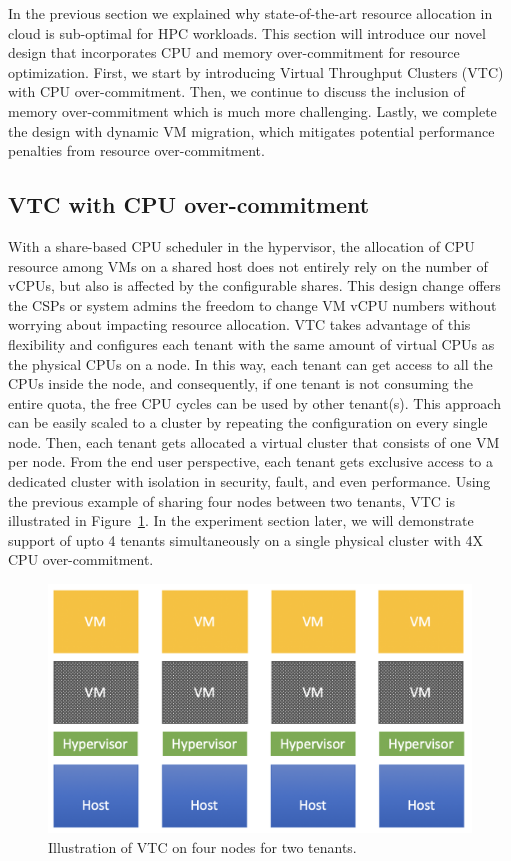 In the previous section we explained why state-of-the-art resource allocation in cloud 
is sub-optimal for HPC workloads. This section will introduce our novel design that incorporates 
CPU and memory over-commitment for resource optimization. First, we start by introducing 
Virtual Throughput Clusters (VTC) with CPU over-commitment. Then, we continue to discuss the 
inclusion of memory over-commitment which is much more challenging. Lastly, we complete the design 
with dynamic VM migration, which mitigates potential 
performance penalties from resource over-commitment. 

\subsection{VTC with CPU over-commitment}
With a share-based CPU scheduler in the hypervisor, the allocation of CPU resource among VMs on a 
shared host does not entirely rely on the number of vCPUs, but also is affected by the configurable shares. 
This design change offers the CSPs or system admins the freedom to 
change VM vCPU numbers without worrying about impacting resource allocation. VTC takes advantage of this 
flexibility and configures each tenant with the same amount of virtual CPUs as the physical CPUs 
on a node. In this way, each tenant can get access to all the CPUs inside the node, and consequently, if one tenant 
is not consuming the entire quota, the free CPU cycles can be used by other tenant(s). 
This approach can be easily scaled to a cluster by repeating the configuration on every 
single node. Then, each tenant gets allocated a virtual cluster that consists of one VM per node. From the end user 
perspective, each tenant gets exclusive access to a dedicated cluster with isolation in security, fault, and even performance.  
Using the previous example of sharing four nodes between two tenants,  
VTC is illustrated in Figure~\ref{fig:vtc}. In the experiment section later, we will demonstrate  
support of upto 4 tenants simultaneously on a single physical cluster with 4X CPU over-commitment.

\begin{figure}[!t]
   \begin{center}
       \includegraphics[width=\columnwidth]{Figures/allocation3}
   \end{center}
   \caption{Illustration of VTC on four nodes for two tenants.}
   \label{fig:vtc}
 \end{figure}

